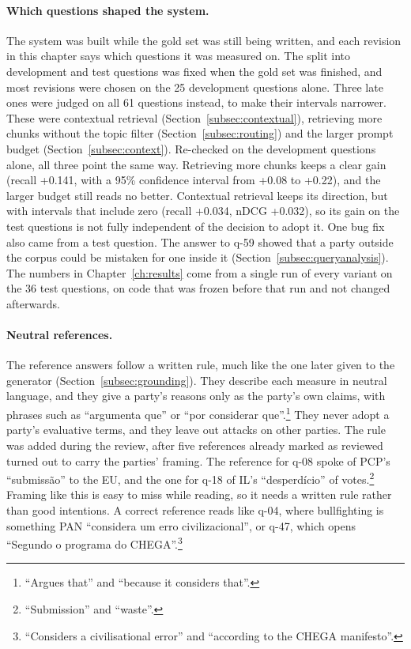 \paragraph{Which questions shaped the system.} The system was built while the
gold set was still being written, and each revision in this chapter says which
questions it was measured on. The split into development and test questions
was fixed when the gold set was finished, and most revisions were chosen on the
25 development questions alone. Three late ones were judged on all 61 questions
instead, to make their intervals narrower. These were contextual retrieval
(Section~\ref{subsec:contextual}), retrieving more chunks without the topic
filter (Section~\ref{subsec:routing}) and the larger prompt budget
(Section~\ref{subsec:context}). Re-checked on the development questions alone,
all three point the same way. Retrieving more chunks keeps a clear gain (recall
+0.141, with a 95\% confidence interval from +0.08 to +0.22), and the larger
budget still reads no better. Contextual retrieval keeps its direction, but
with intervals that include zero (recall +0.034, nDCG +0.032), so its gain on
the test questions is not fully independent of the decision to adopt it. One
bug fix also came from a test question. The answer to q-59 showed that a party
outside the corpus could be mistaken for one inside it
(Section~\ref{subsec:queryanalysis}). The numbers in Chapter~\ref{ch:results}
come from a single run of every variant on the 36 test questions, on code that
was frozen before that run and not changed afterwards.

\paragraph{Neutral references.} The reference answers follow a written rule,
much like the one later given to the generator
(Section~\ref{subsec:grounding}). They describe each measure in neutral
language, and they give a party's reasons only as the party's own claims, with
phrases such as ``argumenta que'' or ``por considerar que''.\footnote{``Argues
that'' and ``because it considers that''.} They never adopt a party's
evaluative terms, and they leave out attacks on other parties. The rule was
added during the review, after five references already marked as reviewed
turned out to carry the parties' framing. The reference for q-08 spoke of PCP's
``submissão'' to the EU, and the one for q-18 of IL's ``desperdício'' of
votes.\footnote{``Submission'' and ``waste''.} Framing like this is easy to
miss while reading, so it needs a written rule rather than good intentions. A
correct reference reads like q-04, where bullfighting is something PAN
``considera um erro civilizacional'', or q-47, which opens ``Segundo o programa
do CHEGA''.\footnote{``Considers a civilisational error'' and ``according to
the CHEGA manifesto''.}

